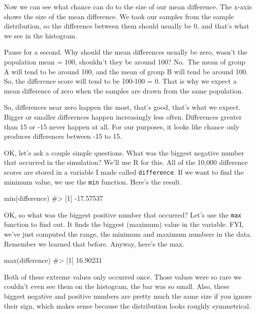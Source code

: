 \documentclass[
  letterpaper,
  DIV=11,
  numbers=noendperiod]{scrreprt}
\newenvironment{Shaded}{\begin{snugshade}}{\end{snugshade}}
\newcommand{\CommentTok}[1]{\textcolor[rgb]{0.37,0.37,0.37}{#1}}
\newcommand{\FunctionTok}[1]{\textcolor[rgb]{0.28,0.35,0.67}{#1}}
\newcommand{\NormalTok}[1]{\textcolor[rgb]{0.00,0.23,0.31}{#1}}
\begin{document}
Now we can see what chance can do to the size of our mean difference.
The x-axis shows the size of the mean difference. We took our samples
from the sample distribution, so the difference between them should
usually be 0, and that's what we see in the histogram.

Pause for a second. Why should the mean differences usually be zero,
wasn't the population mean = 100, shouldn't they be around 100? No.~The
mean of group A will tend to be around 100, and the mean of group B will
tend be around 100. So, the difference score will tend to be 100-100 =
0. That is why we expect a mean difference of zero when the samples are
drawn from the same population.

So, differences near zero happen the most, that's good, that's what we
expect. Bigger or smaller differences happen increasingly less often.
Differences greater than 15 or -15 never happen at all. For our
purposes, it looks like chance only produces differences between -15 to
15.

OK, let's ask a couple simple questions. What was the biggest negative
number that occurred in the simulation? We'll use R for this. All of the
10,000 difference scores are stored in a variable I made called
\texttt{difference}. If we want to find the minimum value, we use the
\texttt{min} function. Here's the result.

\begin{Shaded}
\begin{Highlighting}[]
\FunctionTok{min}\NormalTok{(difference)}
\CommentTok{\#\textgreater{} [1] {-}17.57537}
\end{Highlighting}
\end{Shaded}

OK, so what was the biggest positive number that occurred? Let's use the
\texttt{max} function to find out. It finds the biggest (maximum) value
in the variable. FYI, we've just computed the range, the minimum and
maximum numbers in the data. Remember we learned that before. Anyway,
here's the max.

\begin{Shaded}
\begin{Highlighting}[]
\FunctionTok{max}\NormalTok{(difference)}
\CommentTok{\#\textgreater{} [1] 16.90231}
\end{Highlighting}
\end{Shaded}

Both of these extreme values only occurred once. Those values were so
rare we couldn't even see them on the histogram, the bar was so small.
Also, these biggest negative and positive numbers are pretty much the
same size if you ignore their sign, which makes sense because the
distribution looks roughly symmetrical.
\end{document}
